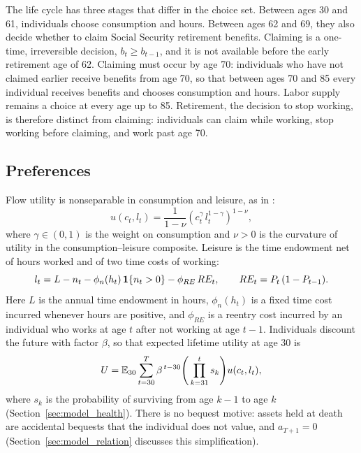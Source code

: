 The life cycle has three stages that differ in the choice set. Between ages 30 and 61, individuals choose consumption and hours. Between ages 62 and 69, they also decide whether to claim Social Security retirement benefits. Claiming is a one-time, irreversible decision, $b_t\geq b_{t-1}$, and it is not available before the early retirement age of 62. Claiming must occur by age 70: individuals who have not claimed earlier receive benefits from age 70, so that between ages 70 and 85 every individual receives benefits and chooses consumption and hours. Labor supply remains a choice at every age up to 85. Retirement, the decision to stop working, is therefore distinct from claiming: individuals can claim while working, stop working before claiming, and work past age 70.

\subsection{Preferences}\label{sec:model_prefs}

Flow utility is nonseparable in consumption and leisure, as in \citet{french2011effects}:
\begin{equation}\label{eq:utility}
u(c_t,l_t)=\frac{1}{1-\nu}\left(c_t^{\gamma}\,l_t^{1-\gamma}\right)^{1-\nu},
\end{equation}
where $\gamma\in(0,1)$ is the weight on consumption and $\nu>0$ is the curvature of utility in the consumption--leisure composite. Leisure is the time endowment net of hours worked and of two time costs of working:
\begin{equation}\label{eq:leisure}
l_t=L-n_t-\phi_n(h_t)\,\mathbf{1}\{n_t>0\}-\phi_{RE}\,RE_t, \qquad RE_t=P_t\,(1-P_{t-1}).
\end{equation}
Here $L$ is the annual time endowment in hours, $\phi_n(h_t)$ is a fixed time cost incurred whenever hours are positive, and $\phi_{RE}$ is a reentry cost incurred by an individual who works at age $t$ after not working at age $t-1$. Individuals discount the future with factor $\beta$, so that expected lifetime utility at age 30 is
\begin{equation*}
U=\mathbb{E}_{30}\sum_{t=30}^{T}\beta^{\,t-30}\Bigg(\prod_{k=31}^{t}s_k\Bigg)u(c_t,l_t),
\end{equation*}
where $s_k$ is the probability of surviving from age $k-1$ to age $k$ (Section~\ref{sec:model_health}). There is no bequest motive: assets held at death are accidental bequests that the individual does not value, and $a_{T+1}=0$ (Section~\ref{sec:model_relation} discusses this simplification).

